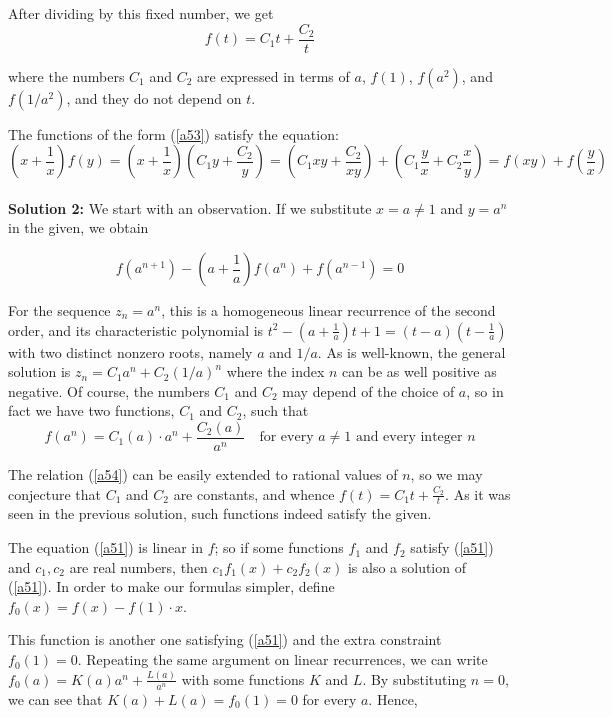 \documentclass[a4paper, 12pt]{article}
\begin{document}
\begin{enumerate}
After dividing by this fixed number, we get
\begin{equation} \label{a53}
    f(t) = C_1 t + \frac{C_2}{t} 
\end{equation}

where the numbers $C_1$ and $C_2$ are expressed in terms of $a$, $f(1)$, $f(a^2)$, and $f(1/a^2)$, and they do not depend on $t$.

The functions of the form (\ref{a53}) satisfy the equation:
$$
\left( x + \frac{1}{x} \right) f(y) = \left( x + \frac{1}{x} \right) \left( C_1 y + \frac{C_2}{y} \right) = \left( C_1 xy + \frac{C_2}{xy} \right) + \left(C_1 \frac{y}{x} + C_2 \frac{x}{y} \right) = f(xy) + f\left( \frac{y}{x} \right)
$$ \\


\textbf{Solution 2:}  We start with an observation.  If we substitute $x = a \not = 1$ and $y = a^n$ in the given, we obtain

$$
f(a^{n+1}) - \left(a + \frac{1}{a} \right)  f(a^n) + f(a^{n-1}) = 0
$$

For the sequence $z_n = a^n$, this is a homogeneous linear recurrence of the second order, and its characteristic polynomial is $t^2 - (a + \frac{1}{a})t + 1 = (t-a)(t - \frac{1}{a})$ with two distinct nonzero roots, namely $a$ and $1/a$. As is well-known, the general solution is $z_n = C_1 a^n + C_2 (1/a)^n$ where the index $n$ can be as well positive as negative. Of course, the numbers $C_1$ and $C_2$ may depend of the choice of $a$, so in fact we have two functions, $C_1$ and $C_2$, such that
\begin{equation} \label{a54}
    f(a^n) = C_1(a) \cdot a^n + \frac{C_2(a)}{a^n} \quad \textrm{for every $a \not = 1$ and every integer $n$}
\end{equation}

The relation (\ref{a54}) can be easily extended to rational values of $n$, so we may conjecture that $C_1$ and $C_2$ are constants, and whence $f(t) = C_1 t + \frac{C_2}{t}$.  As it was seen in the previous solution, such functions indeed satisfy the given.

The equation (\ref{a51}) is linear in $f$; so if some functions $f_1$ and $f_2$ satisfy (\ref{a51}) and $c_1, c_2$ are real numbers, then $c_1 f_1(x) + c_2 f_2(x)$ is also a solution of (\ref{a51}). In order to make our formulas simpler, define
$ f_0(x) = f(x) - f(1) \cdot x$.

This function is another one satisfying (\ref{a51}) and the extra constraint $f_0(1) = 0$. Repeating the same argument on linear recurrences, we can write $f_0(a) = K(a) a^n + \frac{L(a)}{a^n}$ with some functions $K$ and $L$. By substituting $n = 0$, we can see that $K(a) + L(a) = f_0(1) = 0$ for every $a$. Hence,


\end{enumerate}
\end{document}
